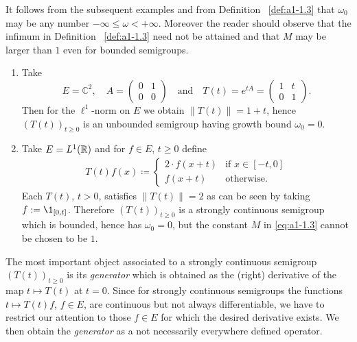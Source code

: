 It follows from the subsequent examples and from Definition ~\ref{def:a1-1.3} that $\omega_{0}$ may be any number $ -\infty \leq \omega < +\infty$.
Moreover the reader should observe that the infimum in Definition ~\ref{def:a1-1.3} need not be attained and that $M$ may be larger than $1$ even for bounded semigroups.
\begin{examples}\label{ex:a1-1.4}
\begin{enumerate}[\upshape(i), wide, labelindent=.5em]

\item 
Take 
\[
	E = \mathbb{C}^{2}, \quad
	A = \begin{pmatrix}0 & 1\\0 & 0\end{pmatrix} 
	\quad \text{and} \quad 
	T(t) = e^{tA} = \begin{pmatrix}1 & t\\0 & 1\end{pmatrix} .
\]
%
Then for the $\ell^{1}$-norm on $E$ we obtain $\|T(t)\| = 1 + t$, hence $(T(t))_{t\geq0}$ is an unbounded semigroup having growth bound $\omega_{0} = 0$.

\item 
Take $E = L^1(\mathbb{R})$ and for $f \in E$, $t \geq 0$ define
\begin{align*}
T(t)f(x) \coloneqq 
	\begin{cases}
		2\cdot f(x+t) & \text{if } x \in [-t,0] \\
		f(x+t) & \text{otherwise}.
	\end{cases}
\end{align*}
Each $T(t)$, $t > 0$, satisfies $\|T(t)\| = 2$ as can be seen by taking $f := \1_{[0,t]}$.
Therefore $(T(t))_{t \geq 0}$ is a strongly continuous semigroup which is bounded, hence has $\omega_{0} = 0$, but the constant $M$ in \eqref{eq:a1-1.3} cannot be chosen to be $1$.

\end{enumerate}
\end{examples}
The most important object associated to a strongly continuous semigroup $(T(t))_{t\geq0}$ is its \emph{generator} which is obtained as the (right) derivative of the map $t \mapsto T(t)$ at $t = 0$.
Since for strongly continuous semigroups the functions $t \mapsto T(t)f$, $f \in E$, are continuous but not always differentiable, we have to restrict our attention to those $f \in E$ for which the desired derivative exists.
We then obtain the \emph{generator} as a not necessarily everywhere defined operator.

